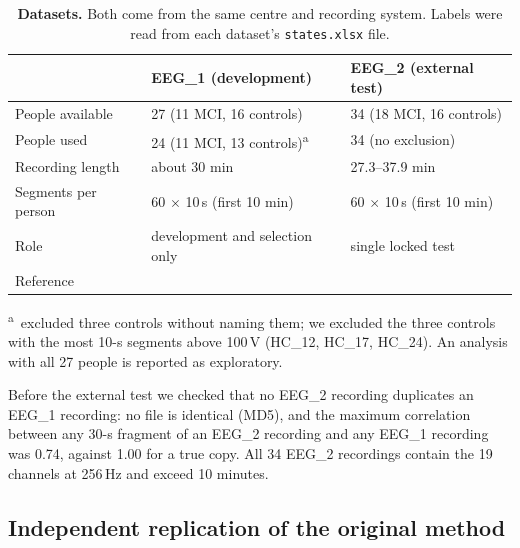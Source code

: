 \begin{table}[t]
\centering\small
\caption{\textbf{Datasets.} Both come from the same centre and recording system. Labels were read from each dataset's \texttt{states.xlsx} file.}
\label{tab:data}
\begin{tabular}{@{}lll@{}}
\toprule
 & EEG\_1 (development) & EEG\_2 (external test) \\
\midrule
People available & 27 (11 MCI, 16 controls) & 34 (18 MCI, 16 controls) \\
People used & 24 (11 MCI, 13 controls)\textsuperscript{a} & 34 (no exclusion) \\
Recording length & about 30 min & 27.3--37.9 min \\
Segments per person & 60 $\times$ 10\,s (first 10 min) & 60 $\times$ 10\,s (first 10 min) \\
Role & development and selection only & single locked test \\
Reference & \citet{kashefpoor2016} & \citet{kashefpoor2019} \\
\bottomrule
\end{tabular}

\smallskip\footnotesize\raggedright \textsuperscript{a}\,\citet{aljalal2024} excluded three controls without naming them; we excluded the three controls with the most 10-s segments above 100\,\textmu V (HC\_12, HC\_17, HC\_24). An analysis with all 27 people is reported as exploratory.
\end{table}

Before the external test we checked that no EEG\_2 recording duplicates an EEG\_1 recording: no file is identical (MD5), and the maximum correlation between any 30-s fragment of an EEG\_2 recording and any EEG\_1 recording was 0.74, against 1.00 for a true copy. All 34 EEG\_2 recordings contain the 19 channels at 256\,Hz and exceed 10 minutes.

\subsection{Independent replication of the original method}

